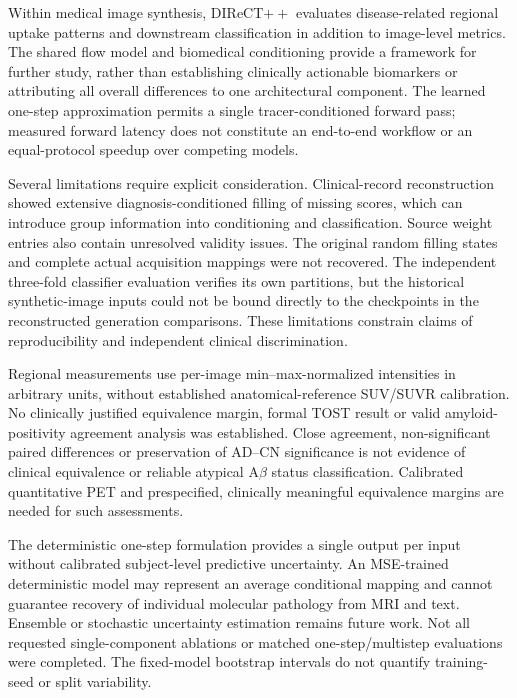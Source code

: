 Within medical image synthesis, DIReCT$++$ evaluates disease-related regional uptake patterns and downstream classification in addition to image-level metrics. The shared flow model and biomedical conditioning provide a framework for further study, rather than establishing clinically actionable biomarkers or attributing all overall differences to one architectural component. The learned one-step approximation permits a single tracer-conditioned forward pass; measured forward latency does not constitute an end-to-end workflow or an equal-protocol speedup over competing models.

Several limitations require explicit consideration. Clinical-record reconstruction showed extensive diagnosis-conditioned filling of missing scores, which can introduce group information into conditioning and classification. Source weight entries also contain unresolved validity issues. The original random filling states and complete actual acquisition mappings were not recovered. The independent three-fold classifier evaluation verifies its own partitions, but the historical synthetic-image inputs could not be bound directly to the checkpoints in the reconstructed generation comparisons. These limitations constrain claims of reproducibility and independent clinical discrimination.

Regional measurements use per-image min--max-normalized intensities in arbitrary units, without established anatomical-reference SUV/SUVR calibration. No clinically justified equivalence margin, formal TOST result or valid amyloid-positivity agreement analysis was established. Close agreement, non-significant paired differences or preservation of AD--CN significance is not evidence of clinical equivalence or reliable atypical A$\beta$ status classification. Calibrated quantitative PET and prespecified, clinically meaningful equivalence margins are needed for such assessments.

The deterministic one-step formulation provides a single output per input without calibrated subject-level predictive uncertainty. An MSE-trained deterministic model may represent an average conditional mapping and cannot guarantee recovery of individual molecular pathology from MRI and text. Ensemble or stochastic uncertainty estimation remains future work. Not all requested single-component ablations or matched one-step/multistep evaluations were completed. The fixed-model bootstrap intervals do not quantify training-seed or split variability.


